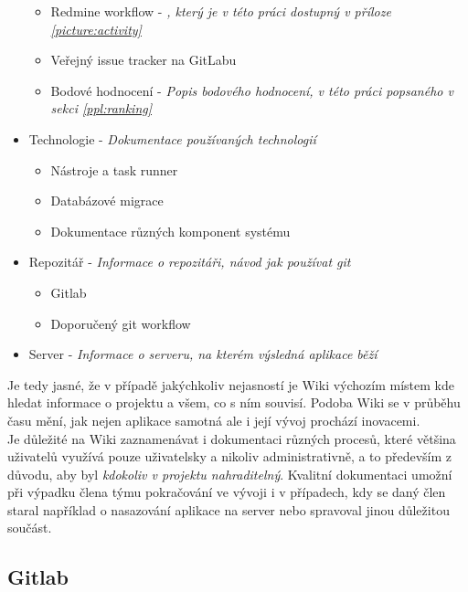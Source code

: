 \begin{itemize}
\begin{itemize}
		\item Redmine workflow - \emph{, který je v této práci dostupný v příloze \ref{picture:activity}}
		\item Veřejný issue tracker na GitLabu
		\item Bodové hodnocení - \emph{Popis bodového hodnocení, v této práci popsaného v sekci \ref{ppl:ranking}}
	\end{itemize}
	\item Technologie - \emph{Dokumentace používaných technologií}
	\begin{itemize}
		\item Nástroje a task runner
		\item Databázové migrace
		\item Dokumentace různých komponent systému
	\end{itemize}
	\item Repozitář - \emph{Informace o repozitáři, návod jak používat git}
	\begin{itemize}
		\item Gitlab
		\item Doporučený git workflow
	\end{itemize}
	\item Server - \emph{Informace o serveru, na kterém výsledná aplikace běží}
\end{itemize}

Je tedy jasné, že v případě jakýchkoliv nejasností je Wiki výchozím místem kde hledat informace o projektu a všem, co s ním souvisí. Podoba Wiki se v průběhu času mění, jak nejen aplikace samotná ale i její vývoj prochází inovacemi.\\
Je důležité na Wiki zaznamenávat i dokumentaci různých procesů, které většina uživatelů využívá pouze uživatelsky a nikoliv administrativně, a to především z důvodu, aby byl \emph{kdokoliv v projektu nahraditelný}. Kvalitní dokumentaci umožní při výpadku člena týmu pokračování ve vývoji i v případech, kdy se daný člen staral například o nasazování aplikace na server nebo spravoval jinou důležitou součást.

\subsection{Gitlab}

